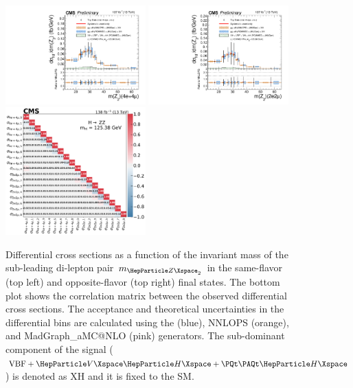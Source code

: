 \clearpage

\begin{center}
	\begin{figure}[!htb]
		\centering
		\includegraphics[width=0.48\textwidth]{Images/H4L/ZCands/model_v4/massZ2_unfoldwith_4l_SM_125_asimov.pdf}
		\includegraphics[width=0.48\textwidth]{Images/H4L/ZCands/model_v4/massZ2_unfoldwith_2e2mu_SM_125_asimov.pdf}\\
		\includegraphics[width=0.48\textwidth]{Images/H4L/correlations/corr_massZ2_v4.pdf}\\	
		\caption{
			Differential cross sections as a function of the invariant mass of the sub-leading di-lepton pair $m_{\PZ_{2}}$ in the same-flavor (top left) and opposite-flavor (top right)  final states.
			The bottom plot shows the correlation matrix between the observed differential cross sections.
			The acceptance and theoretical uncertainties in the differential bins are calculated using the \POWHEG (blue), NNLOPS (orange), and MadGraph\_aMC@NLO (pink) generators.
			The sub-dominant component of the signal ($\VBF + \VH + \ttH$) is denoted as XH and it is fixed to the SM.
			\label{fig:fidMZ2}}
	\end{figure}
\end{center}

